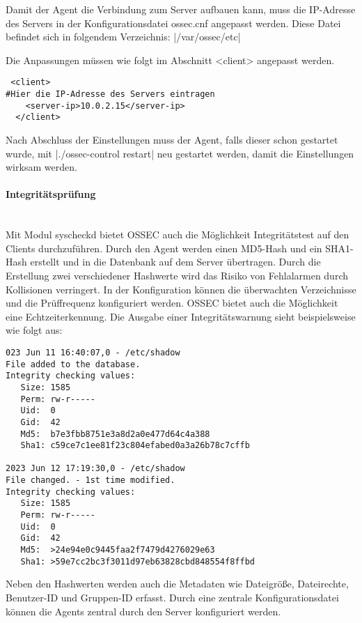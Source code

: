 \noindent Damit der Agent die Verbindung zum Server aufbauen kann, muss die IP-Adresse des Servers in der Konfigurationsdatei ossec.cnf angepasst werden. Diese Datei befindet sich in folgendem Verzeichnis: |/var/ossec/etc| 

\noindent Die Anpassungen müssen wie folgt im Abschnitt <client> angepasst werden.   
\begin{verbatim}
 <client>
#Hier die IP-Adresse des Servers eintragen
    <server-ip>10.0.2.15</server-ip> 
  </client>
\end{verbatim}

\noindent Nach Abschluss der Einstellungen muss der Agent, falls dieser schon gestartet wurde, mit |./ossec-control restart| neu gestartet werden, damit die Einstellungen wirksam werden.

\paragraph{Integritätsprüfung}
\noindent \\Mit Modul syscheckd bietet OSSEC auch die Möglichkeit Integritätstest auf den Clients durchzuführen. Durch den Agent werden einen MD5-Hash und ein SHA1-Hash erstellt und in die Datenbank auf dem Server übertragen. Durch die Erstellung zwei verschiedener Hashwerte wird das Risiko von Fehlalarmen durch Kollisionen verringert. In der Konfiguration können die überwachten Verzeichnisse und die Prüffrequenz konfiguriert werden. OSSEC bietet auch die Möglichkeit eine Echtzeiterkennung. Die Ausgabe einer Integritätswarnung sieht beispielsweise wie folgt aus:
\begin{verbatim}
023 Jun 11 16:40:07,0 - /etc/shadow
File added to the database. 
Integrity checking values:
   Size: 1585
   Perm: rw-r-----
   Uid:  0
   Gid:  42
   Md5:  b7e3fbb8751e3a8d2a0e477d64c4a388
   Sha1: c59ce7c1ee81f23c804efabed0a3a26b78c7cffb

2023 Jun 12 17:19:30,0 - /etc/shadow
File changed. - 1st time modified.
Integrity checking values:
   Size: 1585
   Perm: rw-r-----
   Uid:  0
   Gid:  42
   Md5:  >24e94e0c9445faa2f7479d4276029e63
   Sha1: >59e7cc2bc3f3011d97eb63828cbd848554f8ffbd
\end{verbatim}

\noindent Neben den Hashwerten werden auch die Metadaten wie Dateigröße, Dateirechte, Benutzer-ID und Gruppen-ID erfasst. Durch eine zentrale Konfigurationsdatei können die Agents zentral durch den Server konfiguriert werden. 

